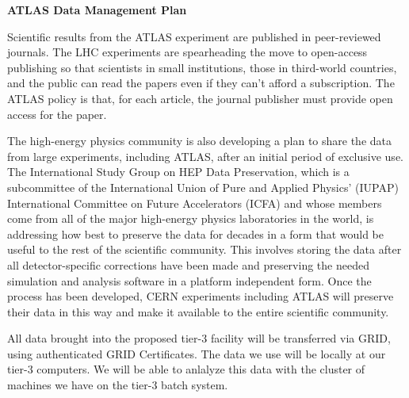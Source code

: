 \documentclass[11pt]{article}
\begin{document}
\begin{center}
\bf{\huge{ATLAS Data Management Plan}}
\end{center}
Scientific results from the ATLAS experiment are published in peer-reviewed journals. The LHC experiments are spearheading the move to open-access publishing so that scientists in small institutions, those in third-world countries, and the public can read the papers even if they can’t afford a subscription. The ATLAS policy is that, for each article, the journal publisher must provide open access for the paper.

The high-energy physics community is also developing a plan to share the data from large experiments, including ATLAS, after an initial period of exclusive use. The International Study Group on HEP Data Preservation, which is a subcommittee of the International Union of Pure and Applied Physics’ (IUPAP) International Committee on Future Accelerators (ICFA) and whose members come from all of the major high-energy physics laboratories in the world, is addressing how best to preserve the data for decades in a form that would be useful to the rest of the scientific community. This involves storing the data after all detector-specific corrections have been made and preserving the needed simulation and analysis software in a platform independent form. Once the process has been developed, CERN experiments including ATLAS will preserve their data in this way and make it available to the entire scientific community.

All data brought into the proposed tier-3 facility will be transferred via GRID, using authenticated GRID Certificates. The data we use will be locally at our tier-3 computers.  We will be able to anlalyze this data with the cluster of machines we have on the tier-3 batch system.
\end{document}
